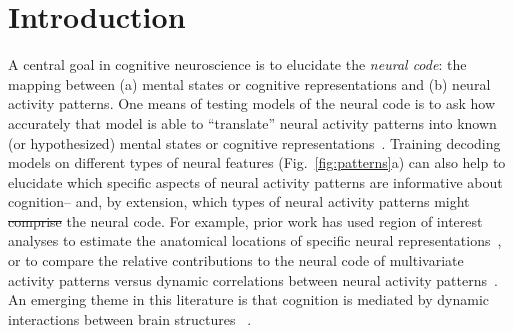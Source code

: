 \documentclass[english]{article}
\providecommand{\DIFaddtex}[1]{{\protect\color{blue}\uwave{#1}}} %
\providecommand{\DIFdeltex}[1]{{\protect\color{red}\sout{#1}}}                      %
\providecommand{\DIFaddbegin}{} %
\providecommand{\DIFaddend}{} %
\providecommand{\DIFdelbegin}{} %
\providecommand{\DIFdelend}{} %
\providecommand{\DIFadd}[1]{\texorpdfstring{\DIFaddtex{#1}}{#1}} %
\providecommand{\DIFdel}[1]{\texorpdfstring{\DIFdeltex{#1}}{}} %
\newcommand{\DIFscaledelfig}{0.5}
\newlength{\DIFdelgraphicswidth} %
\newlength{\DIFdelgraphicsheight} %
\newcommand{\DIFaddincludegraphics}[2][]{{\color{blue}\fbox{\DIFOincludegraphics[#1]{#2}}}} %
\newcommand{\DIFdelincludegraphics}[2][]{%
\sbox{\DIFdelgraphicsbox}{\DIFOincludegraphics[#1]{#2}}%
\settoboxwidth{\DIFdelgraphicswidth}{\DIFdelgraphicsbox} %
\settoboxtotalheight{\DIFdelgraphicsheight}{\DIFdelgraphicsbox} %
\scalebox{\DIFscaledelfig}{%
\parbox[b]{\DIFdelgraphicswidth}{\usebox{\DIFdelgraphicsbox}\\[-\baselineskip] \rule{\DIFdelgraphicswidth}{0em}}\llap{\resizebox{\DIFdelgraphicswidth}{\DIFdelgraphicsheight}{%
\setlength{\unitlength}{\DIFdelgraphicswidth}%
\begin{picture}(1,1)%
\thicklines\linethickness{2pt} %
{\color[rgb]{1,0,0}\put(0,0){\framebox(1,1){}}}%
{\color[rgb]{1,0,0}\put(0,0){\line( 1,1){1}}}%
{\color[rgb]{1,0,0}\put(0,1){\line(1,-1){1}}}%
\end{picture}%
}\hspace*{3pt}}} %
} %
\DeclareRobustCommand{\DIFaddbegin}{\DIFOaddbegin \let\includegraphics\DIFaddincludegraphics} %
\DeclareRobustCommand{\DIFaddend}{\DIFOaddend \let\includegraphics\DIFOincludegraphics} %
\DeclareRobustCommand{\DIFdelbegin}{\DIFOdelbegin \let\includegraphics\DIFdelincludegraphics} %
\DeclareRobustCommand{\DIFdelend}{\DIFOaddend \let\includegraphics\DIFOincludegraphics} %
\begin{document}
\section*{Introduction}
A central goal in cognitive neuroscience is to elucidate the
\textit{neural code}: the mapping between (a) mental states or
cognitive representations and (b) neural activity patterns. One means
of testing models of the neural code is to ask how accurately that
model is able to ``translate'' neural activity patterns into known (or
hypothesized) mental states or cognitive
representations~\citep[e.g.,][]{HaxbEtal01, NormEtal06, TongPrat12,
  MitcEtal08a, KamiTong05, NishEtal11, PereEtal18, HuthEtal12,
  HuthEtal16}.  Training decoding models on different types of neural
features (Fig.~\ref{fig:patterns}a) can also help to elucidate which
specific aspects of neural activity patterns are informative about
cognition-- and, by extension, which types of neural activity patterns
might \DIFdelbegin \DIFdel{comprise }\DIFdelend \DIFaddbegin \DIFadd{compose }\DIFaddend the neural code.  For example, prior work has used
region of interest analyses to estimate the anatomical locations of
specific neural representations~\citep[e.g.,][]{EtzeEtal09}, or to
compare the relative contributions to the neural code of multivariate
activity patterns versus dynamic correlations between neural activity
patterns~\citep[e.g.,][]{MannEtal18, FongEtal19}.  An emerging theme
in this literature is that cognition is mediated by dynamic
interactions between brain structures~\DIFdelbegin %
\DIFdelend \DIFaddbegin \citep{Gros88, Fris00, SporHone06, BassEtal06,
  Turk13, DemeEtal19, SoloEtal19, LuriEtal18, PretEtal17, ZouEtal19,
  MackEtal17}\DIFaddend .
\end{document}
